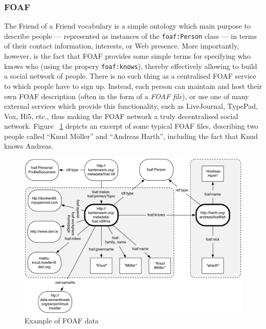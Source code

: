 \documentclass[twoside]{fast_latex}
\begin{document}
\subsubsection{FOAF} %
\label{ssub:foaf}

The Friend of a Friend vocabulary is a simple ontology which main purpose to describe people --- represented as instances of the \texttt{foaf:Person} class --- in terms of their contact information, interests, or Web presence. More importantly, however, is the fact that FOAF provides some simple terms for specifying who knows who (using the propery \texttt{foaf:knows}), thereby effectively allowing to build a social network of people. There is no such thing as a centralised FOAF service to which people have to sign up. Instead, each person can maintain and host their own FOAF description (often in the form of a \emph{FOAF file}), or use one of many external services which provide this functionality, such as LiveJournal, TypePad, Vox, Hi5, etc., thus making the FOAF network a truly decentralised social network. Figure ~\ref{fig:foaf_example} depicts an excerpt of some typical FOAF files, describing two people called ``Knud M\"oller'' and ``Andreas Harth'', including the fact that Knud knows Andreas.

\begin{figure}[ht]
  \begin{center}
    \includegraphics[width=\linewidth]{images/foaf_example.pdf}
    \caption{Example of FOAF data}
    \label{fig:foaf_example}
  \end{center}
\end{figure}
\end{document}
